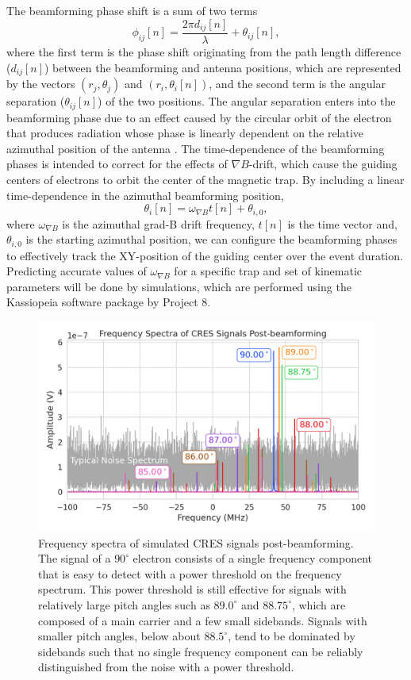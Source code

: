 The beamforming phase shift is a sum of two terms
\begin{equation}
    \phi_{ij}[n]=\frac{2\pi d_{ij}[n]}{\lambda}+\theta_{ij}[n],
\end{equation}
where the first term is the phase shift originating from the path length difference ($d_{ij}[n]$) between the beamforming and antenna positions, which are represented by the vectors $(r_j,\theta_j)$ and $(r_i,\theta_i[n])$, and the second term is the angular separation ($\theta_{ij}[n]$) of the two positions. The angular separation enters into the beamforming phase due to an effect caused by the circular orbit of the electron that produces radiation whose phase is linearly dependent on the relative azimuthal position of the antenna \cite{nb_thesis, p8synca}. The time-dependence of the beamforming phases is intended to correct for the effects of $\nabla B$-drift, which cause the guiding centers of electrons to orbit the center of the magnetic trap. By including a linear time-dependence in the azimuthal beamforming position,
\begin{equation}
    \theta_{i}[n]=\omega_{\nabla B}t[n]+\theta_{i,0},
\end{equation}
where $\omega_{\nabla B}$ is the azimuthal grad-B drift frequency, $t[n]$ is the time vector and, $\theta_{i,0}$ is the starting azimuthal position, we can configure the beamforming phases to effectively track the XY-position of the guiding center over the event duration. Predicting accurate values of $\omega_{\nabla B}$ for a specific trap and set of kinematic parameters will be done by simulations, which are performed using the Kassiopeia software package \cite{kassiopeia} by Project 8.

\begin{figure}[ht]
    \centering
    \includegraphics[width=.7\textwidth]{figs/Chapter-4/230313_cres_signal_post_bf_examples.png}
    \caption{Frequency spectra of simulated CRES signals post-beamforming. The signal of a $90^\circ$ electron consists of a single frequency component that is easy to detect with a power threshold on the frequency spectrum. This power threshold is still effective for signals with relatively large pitch angles such as $89.0^\circ$ and $88.75^\circ$, which are composed of a main carrier and a few small sidebands. Signals with smaller pitch angles, below about $88.5^\circ$, tend to be dominated by sidebands such that no single frequency component can be reliably distinguished from the noise with a power threshold.
    }
    \label{fig:signal_post_bf_example}
\end{figure}

